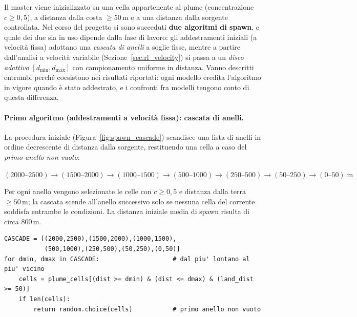 Il master viene inizializzato su una cella appartenente al plume (concentrazione
$c \geq 0{,}5$), a distanza dalla costa $\geq 50\,\text{m}$ e a una distanza dalla
sorgente controllata. Nel corso del progetto si sono succeduti \textbf{due algoritmi di
spawn}, e quale dei due sia in uso dipende dalla fase di lavoro: gli addestramenti iniziali
(a velocit\`a fissa) adottano una \emph{cascata di anelli} a soglie fisse, mentre a partire
dall'analisi a velocit\`a variabile (Sezione~\ref{sec:rl_velocity}) si passa a un
\emph{disco adattivo} $[d_{\min},d_{\max}]$ con campionamento uniforme in distanza. Vanno
descritti entrambi perch\'e coesistono nei risultati riportati: ogni modello eredita
l'algoritmo in vigore quando \`e stato addestrato, e i confronti fra modelli tengono conto
di questa differenza.

\paragraph{Primo algoritmo (addestramenti a velocit\`a fissa): cascata di anelli.}
La procedura iniziale (Figura~\ref{fig:spawn_cascade}) scandisce una lista di anelli in
ordine decrescente di distanza dalla sorgente, restituendo una cella a caso del
\emph{primo anello non vuoto}:
\begin{center}
$(2000\text{--}2500) \to (1500\text{--}2000) \to (1000\text{--}1500) \to
(500\text{--}1000) \to (250\text{--}500) \to (50\text{--}250) \to (0\text{--}50)\;\text{m}$
\end{center}
Per ogni anello vengono selezionate le celle con $c \geq 0{,}5$ e distanza dalla terra
$\geq 50\,\text{m}$; la cascata scende all'anello successivo solo se nessuna cella del
corrente soddisfa entrambe le condizioni. La distanza iniziale media di spawn risulta di
circa $800\,\text{m}$.

\begin{lstlisting}
CASCADE = [(2000,2500),(1500,2000),(1000,1500),
           (500,1000),(250,500),(50,250),(0,50)]
for dmin, dmax in CASCADE:                    # dal piu' lontano al piu' vicino
    cells = plume_cells[(dist >= dmin) & (dist <= dmax) & (land_dist >= 50)]
    if len(cells):
        return random.choice(cells)           # primo anello non vuoto
\end{lstlisting}

